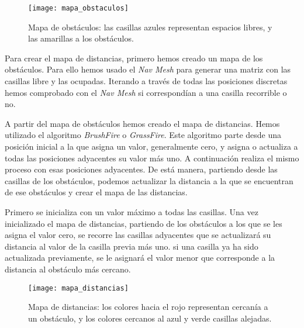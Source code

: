 \begin{figure}[htpb]
    \centering
    \texttt{[image: mapa\_obstaculos]}
    \caption[Representación del mapa de obstáculos]{Mapa de obstáculos: las casillas azules representan espacios libres, y las amarillas a los obstáculos.}
    \label{fig:basics AFM sketch}
\end{figure}

Para crear el mapa de distancias, primero hemos creado un mapa de los obstáculos. Para ello hemos usado el \textit{Nav Mesh} para generar una matriz con las casillas libre y las ocupadas. Iterando a través de todas las posiciones discretas hemos comprobado con el \textit{Nav Mesh} si correspondían a una casilla recorrible o no.

A partir del mapa de obstáculos hemos creado el mapa de distancias. Hemos utilizado el algoritmo \textit{BrushFire} o \textit{GrassFire}. Este algoritmo parte desde una posición inicial a la que asigna un valor, generalmente cero, y asigna o actualiza a todas las posiciones adyacentes su valor más uno. A continuación realiza el mismo proceso con esas posiciones adyacentes. De está manera, partiendo desde las casillas de los obstáculos, podemos actualizar la distancia a la que se encuentran de ese obstáculos y crear el mapa de las distancias.

Primero se inicializa con un valor máximo a todas las casillas. Una vez inicializado el mapa de distancias, partiendo de los obstáculos a los que se les asigna el valor cero, se recorre las casillas adyacentes que se actualizará su distancia al valor de la casilla previa más uno. si una casilla ya ha sido actualizada previamente, se le asignará el valor menor que corresponde a la distancia al obstáculo más cercano.

\begin{figure}[htpb]
    \centering
    \texttt{[image: mapa\_distancias]}
    \caption[Representación del mapa de distancias]{Mapa de distancias: los colores hacia el rojo representan cercanía a un obstáculo, y los colores cercanos al azul y verde casillas alejadas.}
    \label{fig:basics AFM sketch}
\end{figure}

\clearpage
